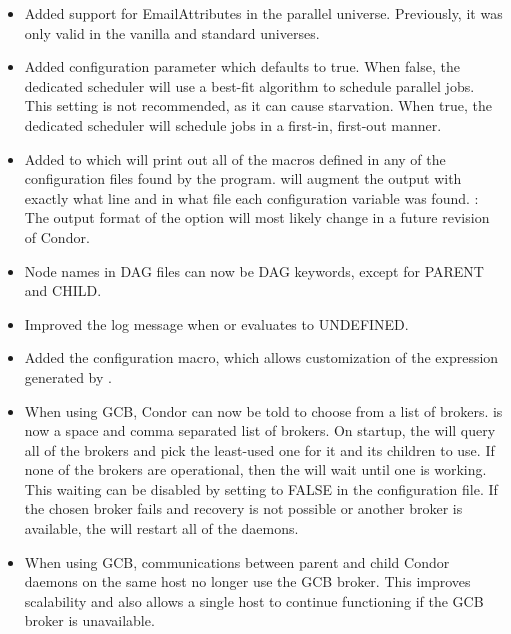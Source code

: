 \begin{itemize}

\item Added support for EmailAttributes in the parallel universe.  
Previously, it was only valid in the vanilla and standard universes.

\item Added configuration parameter 
which defaults to true.  When false, the dedicated scheduler will
use a best-fit algorithm to schedule parallel jobs.  This setting is
not recommended, as it can cause starvation.  When true, the dedicated
scheduler will schedule jobs in a first-in, first-out manner.

\item Added  to  which will print out
all of the macros defined in any of the configuration files found by
the program.
   will augment the output
with exactly what line and in what file each configuration variable
was found.
\Note: The output format of the  option will most likely
change in a future revision of Condor.

\item Node names in  DAG files can now be DAG
keywords, except for PARENT and CHILD.

\item Improved the log message when  or
 evaluates to UNDEFINED.

\item Added the  configuration macro,
which allows customization of the  expression
generated by .

\item When using GCB, Condor can now be told to choose from a list of
brokers.  is now a space and comma separated
list of brokers. On startup, the  will query all of the
brokers and pick the least-used one for it and its children to use. If
none of the brokers are operational, then the  will wait
until one is working. This waiting can be disabled by setting 
 to FALSE in the configuration file.
If the chosen broker fails and recovery is not possible or another broker
is available, the  will restart all of the daemons.

\item When using GCB, communications between parent and child
Condor daemons on the same host no longer use the GCB broker.
This improves scalability and also allows a single host to
continue functioning if the GCB broker is unavailable.


\end{itemize}
